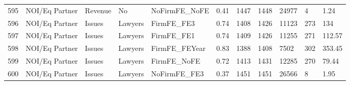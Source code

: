 \begin{table}[ht]
\begin{tabular}{rllllllllll}
  595 & NOI/Eq Partner & Revenue & No & NoFirmFE\_NoFE & 0.41 & 1447 & 1448 & 24977 & 4 & 1.24 \\ 
  596 & NOI/Eq Partner & Issues & Lawyers & FirmFE\_FE3 & 0.74 & 1408 & 1426 & 11123 & 273 & 134 \\ 
  597 & NOI/Eq Partner & Issues & Lawyers & FirmFE\_FE1 & 0.74 & 1409 & 1426 & 11255 & 271 & 112.57 \\ 
  598 & NOI/Eq Partner & Issues & Lawyers & FirmFE\_FEYear & 0.83 & 1388 & 1408 & 7502 & 302 & 353.45 \\ 
  599 & NOI/Eq Partner & Issues & Lawyers & FirmFE\_NoFE & 0.72 & 1413 & 1431 & 12285 & 270 & 79.44 \\ 
  600 & NOI/Eq Partner & Issues & Lawyers & NoFirmFE\_FE3 & 0.37 & 1451 & 1451 & 26566 & 8 & 1.95 \\ 
   \hline
\end{tabular}
\end{table}
